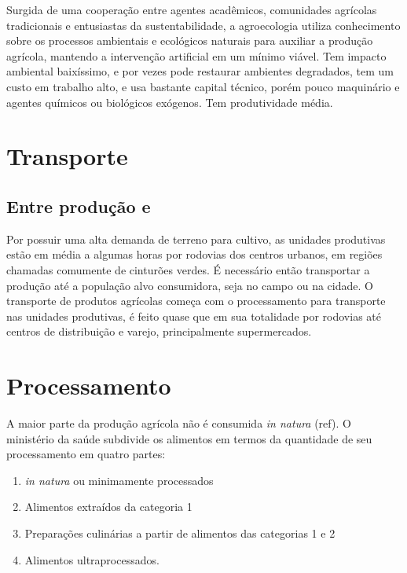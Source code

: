 \documentclass[]{article}
\begin{document}
Surgida de uma cooperação entre agentes acadêmicos, comunidades agrícolas tradicionais e entusiastas da sustentabilidade, a agroecologia utiliza conhecimento sobre os processos ambientais e ecológicos naturais para auxiliar a produção agrícola, mantendo a intervenção artificial em um mínimo viável. Tem impacto ambiental baixíssimo, e por vezes pode restaurar ambientes degradados, tem um custo em trabalho alto, e usa bastante capital técnico, porém pouco maquinário e agentes químicos ou biológicos exógenos. Tem produtividade média.




\section{Transporte}

\subsection{Entre produção e }

Por possuir uma alta demanda de terreno para cultivo, as unidades produtivas estão em média a algumas horas por rodovias dos centros urbanos, em regiões chamadas comumente de cinturões verdes. É necessário então transportar a produção até a população alvo consumidora, seja no campo ou na cidade. O transporte de produtos agrícolas começa com o processamento para transporte nas unidades produtivas, é feito quase que em sua totalidade por rodovias até centros de distribuição e varejo, principalmente supermercados.

\section{Processamento}

A maior parte da produção agrícola não é consumida \textit{in natura} (ref). O ministério da saúde subdivide os alimentos em termos da quantidade de seu processamento em quatro partes: 

\begin{enumerate}
	\item \textit{in natura} ou minimamente processados
	\item Alimentos extraídos da categoria 1
	\item Preparações culinárias a partir de alimentos das categorias 1 e 2
	\item Alimentos ultraprocessados.
\end{enumerate}
\end{document}
